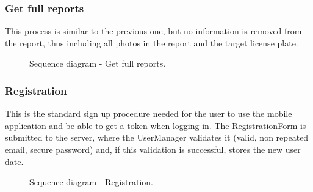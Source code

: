 \subsubsection{Get full reports}
This process is similar to the previous one, but no information is removed from the report, thus including all photos in the report and the target license plate.

\begin{figure}[H]
    \centering
    \caption{\label{fig:sequence-get-full-reports}Sequence diagram - Get full reports.}
\end{figure}

\subsubsection{Registration}
This is the standard sign up procedure needed for the user to use the mobile application and be able to get a token when logging in. The RegistrationForm is submitted to the server, where the UserManager validates it (valid, non repeated email, secure password) and, if this validation is successful, stores the new user date.

\begin{figure}[H]
    \centering
    \caption{\label{fig:sequence-registration}Sequence diagram - Registration.}
\end{figure}

